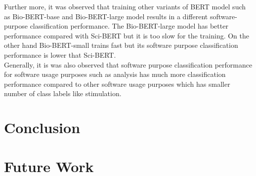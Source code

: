 Further more, it was observed that training other variants of BERT model such as Bio-BERT-base and Bio-BERT-large model results in a different software-purpose classification performance. The Bio-BERT-large model has better performance compared with Sci-BERT but it is too slow for the training. On the other hand Bio-BERT-small trains fast but its software purpose classification performance is lower that Sci-BERT. \\


Generally, it is was also observed that software purpose classification performance for software usage purposes such as analysis has much more classification performance compared to other software usage purposes which has smaller number of class labels like stimulation.   


\section{Conclusion}
\label{sec:chapter07:Conclusion}


\section{Future Work}
\label{sec:chapter07:futurework}


